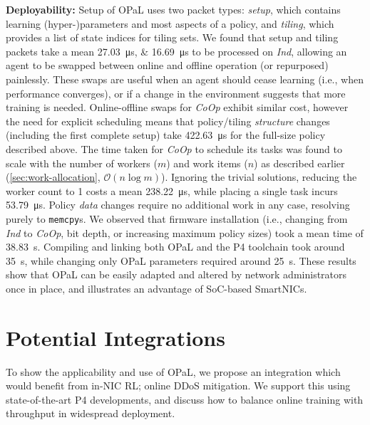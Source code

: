 \documentclass[
sigconf,natbib=false
,anonymous=true
,10pt
]{acmart}
\newcommand{\fakepara}[1]{\noindent\textbf{#1:}}
\newcommand{\approachshort}{OPaL}
\newcommand{\Coopfw}{\emph{CoOp}}
\newcommand{\Indfw}{\emph{Ind}}
\begin{document}
\fakepara{Deployability}
Setup of \approachshort{} uses two packet types: \emph{setup}, which contains learning (hyper-)parameters and most aspects of a policy, and \emph{tiling}, which provides a list of state indices for tiling sets.
We found that setup and tiling packets take a mean \qtylist{27.03;16.69}{\micro\second} to be processed on \Indfw{}, allowing an agent to be swapped between online and offline operation (or repurposed) painlessly.
These swaps are useful when an agent should cease learning (i.e., when performance converges), or if a change in the environment suggests that more training is needed.
Online-offline swaps for \Coopfw{} exhibit similar cost, however the need for explicit scheduling means that policy/tiling \emph{structure} changes (including the first complete setup) take \SI{422.63}{\micro\second} for the full-size policy described above.
The time taken for \Coopfw{} to schedule its tasks was found to scale with the number of workers ($m$) and work items ($n$) as described earlier (\cref{sec:work-allocation}, $\mathcal{O}{\left(n\log{m}\right)}$).
Ignoring the trivial solutions, reducing the worker count to \num{1} costs a mean \SI{238.22}{\micro\second}, while placing a single task incurs \SI{53.79}{\micro\second}.
Policy \emph{data} changes require no additional work in any case, resolving purely to \texttt{memcpy}s.
We observed that firmware installation (i.e., changing from \Indfw{} to \Coopfw{}, bit depth, or increasing maximum policy sizes) took a mean time of \SI{38.83}{\second}.
Compiling and linking both \approachshort{} and the P4 toolchain took around \SI{35}{\second}, while changing only \approachshort{} parameters required around \SI{25}{\second}.
These results show that \approachshort{} can be easily adapted and altered by network administrators once in place, and illustrates an advantage of SoC-based SmartNICs.

\section{Potential Integrations}\label{sec:potential-integrations}
To show the applicability and use of \approachshort{}, we propose an integration which would benefit from in-NIC RL; online DDoS mitigation.
We support this using state-of-the-art P4 developments, and discuss how to balance online training with throughput in widespread deployment.
\end{document}
